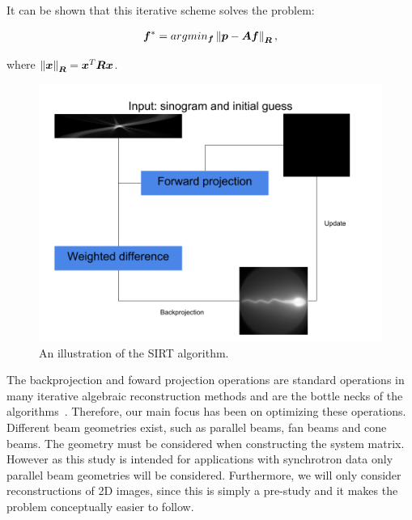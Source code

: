 It can be shown that this iterative scheme solves the problem:

\begin{align}
 \vec{f}^{\ast}=argmin_{\vec{f}}\norm{\vec{p}-\mat{A}\vec{f}}_{\mat{R}},
\end{align}

where $\norm{\vec{x}}_{\mat{R}} = \vec{x}^T\mat{R}\vec{x}$.

\begin{figure}
\includegraphics[width=\linewidth]{images/sirt.png}
\caption{An illustration of the SIRT algorithm.}
\label{fig:sirt}
\end{figure}

The backprojection and foward projection operations are standard operations in many iterative algebraic reconstruction methods and are the bottle necks of the algorithms~\cite{footprints2010}. Therefore, our main focus has been on optimizing these operations.\\
Different beam geometries exist, such as parallel beams, fan beams and cone beams. The geometry must be considered when constructing the system matrix. However as this study is intended for applications with synchrotron data only parallel beam geometries will be considered. Furthermore, we will only consider reconstructions of 2D images, since this is simply a pre-study and it makes the problem conceptually easier to follow.\\
